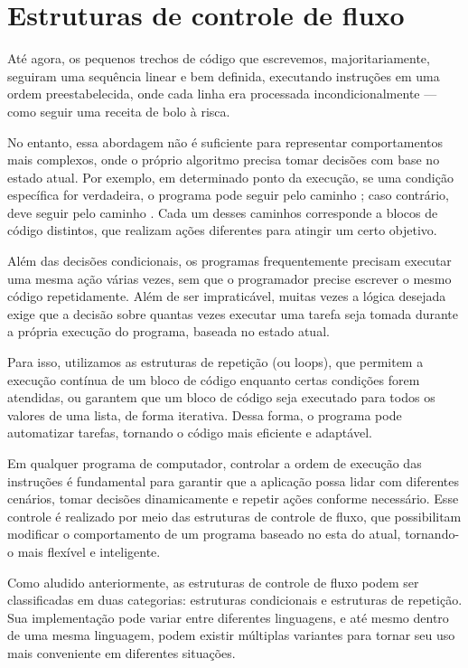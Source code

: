 \chapter{Estruturas de controle de fluxo}\label{iffor}

Até agora, os pequenos trechos de código que escrevemos, majoritariamente, seguiram uma sequência linear e
bem definida, executando instruções em uma ordem preestabelecida, onde cada linha era processada
incondicionalmente --- como seguir uma receita de bolo à risca.

No entanto, essa abordagem não é suficiente para representar comportamentos mais complexos, onde o próprio algoritmo
precisa tomar decisões com base no estado atual.
Por exemplo, em determinado ponto da execução, se uma condição específica for verdadeira, o programa pode seguir
pelo caminho ; caso contrário, deve seguir pelo caminho .
Cada um desses caminhos corresponde a blocos de código distintos, que realizam ações diferentes para atingir um
certo objetivo.


Além das decisões condicionais, os programas frequentemente precisam executar uma mesma ação várias vezes, sem que o
programador precise escrever o mesmo código repetidamente.
Além de ser impraticável, muitas vezes a lógica desejada exige que a decisão sobre quantas vezes executar uma tarefa
seja tomada durante a própria execução do programa, baseada no estado atual.

Para isso, utilizamos as estruturas de repetição (ou loops), que permitem a execução contínua de um bloco de código
enquanto certas condições forem atendidas, ou garantem que um bloco de código seja executado para todos os valores
de uma lista, de forma iterativa.
Dessa forma, o programa pode automatizar tarefas, tornando o código mais eficiente e adaptável.

Em qualquer programa de computador, controlar a ordem de execução das instruções é fundamental para garantir que a
aplicação possa lidar com diferentes cenários, tomar decisões dinamicamente e repetir ações conforme necessário.
Esse controle é realizado por meio das estruturas de controle de fluxo, que possibilitam modificar o comportamento
de um programa baseado no esta do atual, tornando-o mais flexível e inteligente.

Como aludido anteriormente, as estruturas de controle de fluxo podem ser classificadas em duas categorias: estruturas
condicionais e estruturas de repetição.
Sua implementação pode variar entre diferentes linguagens, e até mesmo dentro
de uma mesma linguagem, podem existir múltiplas variantes para tornar seu uso mais conveniente em diferentes situações.

